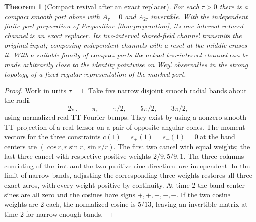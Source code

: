 \documentclass[11pt]{article}
\newtheorem{theorem}{Theorem}
\begin{document}
\begin{theorem}[Compact revival after an exact replacer]
For each \(\tau>0\) there is a compact smooth port above with \(A_\tau=0\) and \(A_{2\tau}\) invertible. With the independent finite-port preparation of Proposition \ref{thm:preparation}, its one-interval reduced channel is an exact replacer. Its two-interval shared-field channel transmits the original input; composing independent channels with a reset at the middle erases it. With a suitable family of compact ports the actual two-interval channel can be made arbitrarily close to the identity pointwise on Weyl observables in the strong topology of a fixed regular representation of the marked port.
\end{theorem}
\begin{proof}
Work in units \(\tau=1\). Take five narrow disjoint smooth radial bands about the radii \[2\pi,\qquad \pi,\qquad \pi/2,\qquad 5\pi/2,\qquad 3\pi/2,\] using normalized real TT Fourier bumps. They exist by using a nonzero smooth TT projection of a real tensor on a pair of opposite angular cones. The moment vectors for the three constraints \(c(1)=s_+(1)=s_-(1)=0\) at the band centers are
\((\cos r,r\sin r,\sin r/r)\). The first two cancel with equal weights; the last three cancel with respective positive weights \(2/9,5/9,1\). The three columns consisting of the first and the two positive sine directions are independent. In the limit of narrow bands, adjusting the corresponding three weights restores all three exact zeros, with every weight positive by continuity. At time 2 the band-center sines are all zero and the cosines have signs \(+,+,-,-,-\). If the two cosine weights are 2 each, the normalized cosine is \(5/13\), leaving an invertible matrix at time 2 for narrow enough bands.


\end{proof}
\end{document}
